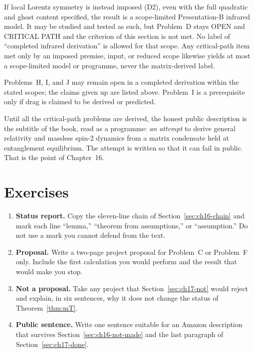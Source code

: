 If local Lorentz symmetry is instead imposed (D2), even with the
full quadratic and ghost content specified, the result is a
scope-limited Presentation-B infrared model. It may be studied and
tested as such, but Problem~D stays OPEN and CRITICAL PATH and the
criterion of this section is not met. No label of ``completed infrared
derivation'' is allowed for that scope. Any critical-path item met
only by an imposed premise, input, or reduced scope likewise yields
at most a scope-limited model or programme, never the matrix-derived
label.

Problems~H, I, and J may remain open in a completed derivation
within the stated scopes; the claims given up are listed above.
Problem~I is a prerequisite only if drag is claimed to be derived or
predicted.

Until all the critical-path problems are derived, the honest public description is
the subtitle of the book, read as a programme:
\emph{an attempt} to derive general relativity and massless
spin-2 dynamics from a matrix condensate held at entanglement
equilibrium. The attempt is written so that it can fail in
public. That is the point of Chapter~16.

\section{Exercises}
\label{sec:ch17-exercises}

\begin{enumerate}
  \item \textbf{Status report.}
    Copy the eleven-line chain of Section~\ref{sec:ch16-chain}
    and mark each line ``lemma,'' ``theorem from assumptions,''
    or ``assumption.'' Do not use a mark you cannot defend
    from the text.
  \item \textbf{Proposal.}
    Write a two-page project proposal for Problem~C or Problem~F
    only. Include the first calculation you would perform and
    the result that would make you stop.
  \item \textbf{Not a proposal.}
    Take any project that Section~\ref{sec:ch17-not} would
    reject and explain, in six sentences, why it does not
    change the status of Theorem~\ref{thm:mT}.
  \item \textbf{Public sentence.}
    Write one sentence suitable for an Amazon description that
    survives Section~\ref{sec:ch16-not-made} and the last
    paragraph of Section~\ref{sec:ch17-done}.
\end{enumerate}

